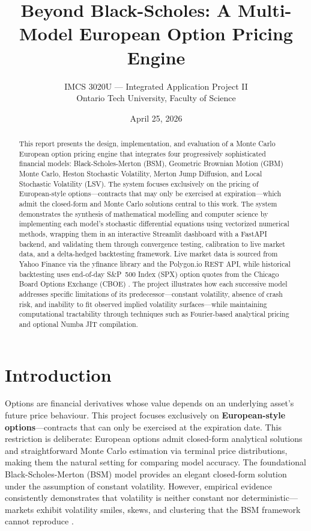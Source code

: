\documentclass[12pt,a4paper]{article}
\title{\textbf{Beyond Black-Scholes: A Multi-Model European Option Pricing Engine}}
\author{IMCS 3020U --- Integrated Application Project II\\Ontario Tech University, Faculty of Science}
\date{April 25, 2026}
\begin{document}
\maketitle
\thispagestyle{empty}
\newpage
\setcounter{page}{1}

\begin{abstract}
This report presents the design, implementation, and evaluation of a Monte Carlo European option pricing engine that integrates four progressively sophisticated financial models: Black-Scholes-Merton (BSM), Geometric Brownian Motion (GBM) Monte Carlo, Heston Stochastic Volatility, Merton Jump Diffusion, and Local Stochastic Volatility (LSV). The system focuses exclusively on the pricing of European-style options---contracts that may only be exercised at expiration---which admit the closed-form and Monte Carlo solutions central to this work. The system demonstrates the synthesis of mathematical modelling and computer science by implementing each model's stochastic differential equations using vectorized numerical methods, wrapping them in an interactive Streamlit dashboard with a FastAPI backend, and validating them through convergence testing, calibration to live market data, and a delta-hedged backtesting framework. Live market data is sourced from Yahoo Finance via the yfinance library and the Polygon.io REST API, while historical backtesting uses end-of-day S\&P~500 Index (SPX) option quotes from the Chicago Board Options Exchange (CBOE) \parencite{singh2024}. The project illustrates how each successive model addresses specific limitations of its predecessor---constant volatility, absence of crash risk, and inability to fit observed implied volatility surfaces---while maintaining computational tractability through techniques such as Fourier-based analytical pricing and optional Numba JIT compilation.
\end{abstract}

\tableofcontents
\newpage

\section{Introduction}

Options are financial derivatives whose value depends on an underlying asset's future price behaviour. This project focuses exclusively on \textbf{European-style options}---contracts that can only be exercised at the expiration date. This restriction is deliberate: European options admit closed-form analytical solutions \parencite{black1973,merton1973} and straightforward Monte Carlo estimation via terminal price distributions, making them the natural setting for comparing model accuracy. The foundational Black-Scholes-Merton (BSM) model provides an elegant closed-form solution under the assumption of constant volatility. However, empirical evidence consistently demonstrates that volatility is neither constant nor deterministic---markets exhibit volatility smiles, skews, and clustering that the BSM framework cannot reproduce \parencite{gatheral2006}.
\end{document}

